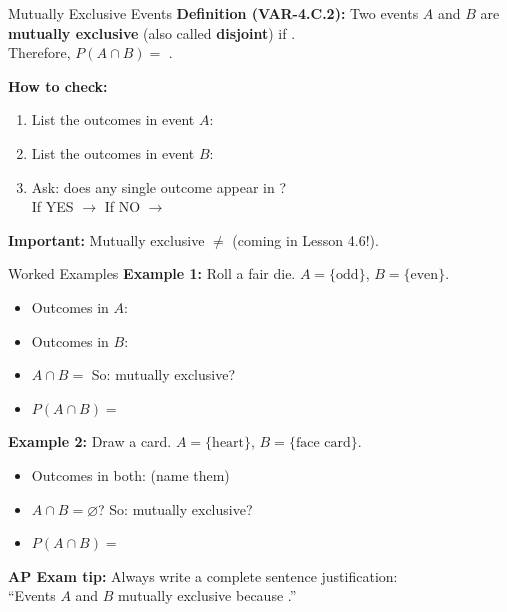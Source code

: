 \documentclass[10pt]{article}
\begin{document}
\begin{notesbox}{Mutually Exclusive Events}
\small
\textbf{Definition (VAR-4.C.2):} Two events $A$ and $B$ are \textbf{mutually exclusive}
(also called \textbf{disjoint}) if \blank{6cm}.\\[6pt]
Therefore, $P(A \cap B) = $ \blank{2cm}.

\vspace{10pt}
\textbf{How to check:}
\begin{enumerate}[leftmargin=1.5em, itemsep=4pt]
  \item List the outcomes in event $A$: \blank{6cm}
  \item List the outcomes in event $B$: \blank{6cm}
  \item Ask: does any single outcome appear in \blank{4cm}?\\
        If YES $\to$ \blank{3.5cm} \quad If NO $\to$ \blank{3.5cm}
\end{enumerate}

\vspace{10pt}
\textbf{Important:} Mutually exclusive $\neq$ \blank{4cm} (coming in Lesson 4.6!).
\end{notesbox}

\vspace{0.1in}

\begin{notesbox}{Worked Examples}
\small
\textbf{Example 1:} Roll a fair die. $A = \{\text{odd}\}$, $B = \{\text{even}\}$.
\begin{itemize}[itemsep=3pt]
  \item Outcomes in $A$: \blank{4cm}
  \item Outcomes in $B$: \blank{4cm}
  \item $A \cap B = $ \blank{2cm} \quad So: mutually exclusive? \blank{2cm}
  \item $P(A \cap B) = $ \blank{2cm}
\end{itemize}

\vspace{8pt}
\textbf{Example 2:} Draw a card. $A = \{\text{heart}\}$, $B = \{\text{face card}\}$.
\begin{itemize}[itemsep=3pt]
  \item Outcomes in both: \blank{6cm} (name them)
  \item $A \cap B = \varnothing$? \blank{2cm} \quad So: mutually exclusive? \blank{2cm}
  \item $P(A \cap B) = $ \blank{2cm}
\end{itemize}

\vspace{8pt}
\textbf{AP Exam tip:} Always write a complete sentence justification:\\[4pt]
``Events $A$ and $B$ \blank{3cm} mutually exclusive because \blank{5cm}.''
\end{notesbox}
\end{document}
